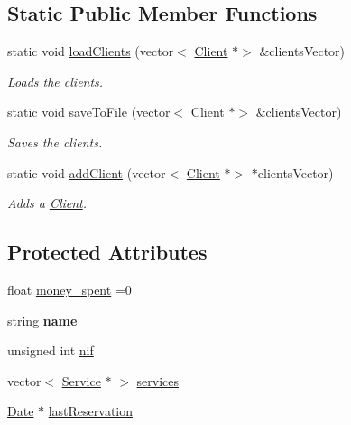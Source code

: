 \subsection*{Static Public Member Functions}
\begin{DoxyCompactItemize}
\item 
static void \hyperlink{class_client_ac18a40ed6975665b7f7661c8dcf7bf1b}{load\+Clients} (vector$<$ \hyperlink{class_client}{Client} $\ast$$>$ \&clients\+Vector)
\begin{DoxyCompactList}\small\item\em Loads the clients. \end{DoxyCompactList}\item 
static void \hyperlink{class_client_aceebaabb74ad1e3e5b30c168e5ef681b}{save\+To\+File} (vector$<$ \hyperlink{class_client}{Client} $\ast$$>$ \&clients\+Vector)
\begin{DoxyCompactList}\small\item\em Saves the clients. \end{DoxyCompactList}\item 
static void \hyperlink{class_client_acd07078857cade36eee66b733de7bc38}{add\+Client} (vector$<$ \hyperlink{class_client}{Client} $\ast$$>$ $\ast$clients\+Vector)
\begin{DoxyCompactList}\small\item\em Adds a \hyperlink{class_client}{Client}. \end{DoxyCompactList}\end{DoxyCompactItemize}
\subsection*{Protected Attributes}
\begin{DoxyCompactItemize}
\item 
float \hyperlink{class_client_a9d5dc70a6eee2fded8217a7983fe5fd0}{money\+\_\+spent} =0
\item 
\mbox{\label{class_client_a456e36f9972a8bf3ecdb5f0e70b3bd5d}} 
string {\bfseries name}
\item 
unsigned int \hyperlink{class_client_a1c94dc96a56cb5032573fb1d528517c2}{nif}
\item 
vector$<$ \hyperlink{class_service}{Service} $\ast$ $>$ \hyperlink{class_client_a02b601f12b9905edae7e64ded9bde912}{services}
\item 
\hyperlink{class_date}{Date} $\ast$ \hyperlink{class_client_a8203fe64182b1c55ef7543bfae6779af}{last\+Reservation}
\end{DoxyCompactItemize}
